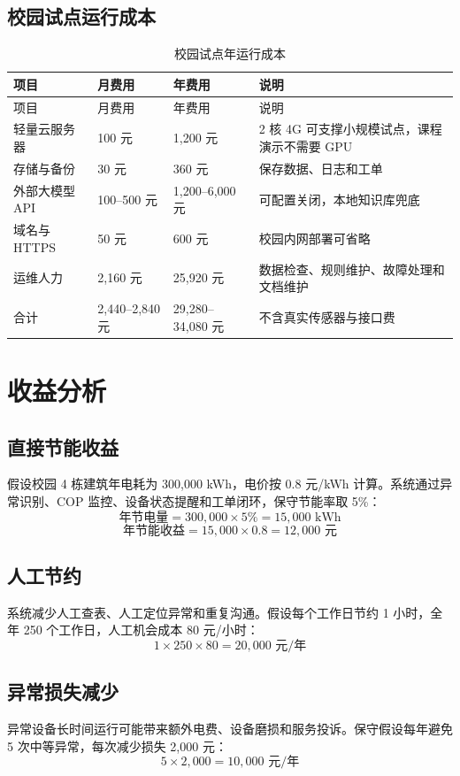 \documentclass[12pt,a4paper]{ctexart}
\begin{document}
\subsection{校园试点运行成本}
\begin{longtable}{p{4cm}p{2.8cm}p{2.8cm}p{4.4cm}}
\caption{校园试点年运行成本}\\
\toprule
项目 & 月费用 & 年费用 & 说明 \\
\midrule
\endfirsthead
\toprule
项目 & 月费用 & 年费用 & 说明 \\
\midrule
\endhead
轻量云服务器 & 100 元 & 1,200 元 & 2 核 4G 可支撑小规模试点，课程演示不需要 GPU \\
存储与备份 & 30 元 & 360 元 & 保存数据、日志和工单 \\
外部大模型 API & 100--500 元 & 1,200--6,000 元 & 可配置关闭，本地知识库兜底 \\
域名与 HTTPS & 50 元 & 600 元 & 校园内网部署可省略 \\
运维人力 & 2,160 元 & 25,920 元 & 数据检查、规则维护、故障处理和文档维护 \\
\midrule
合计 & 2,440--2,840 元 & 29,280--34,080 元 & 不含真实传感器与接口费 \\
\bottomrule
\end{longtable}

\section{收益分析}
\subsection{直接节能收益}
假设校园 4 栋建筑年电耗为 300,000 kWh，电价按 0.8 元/kWh 计算。系统通过异常识别、COP 监控、设备状态提醒和工单闭环，保守节能率取 5\%：
\[
\text{年节电量}=300,000 \times 5\% = 15,000 \text{ kWh}
\]
\[
\text{年节能收益}=15,000 \times 0.8 = 12,000 \text{ 元}
\]

\subsection{人工节约}
系统减少人工查表、人工定位异常和重复沟通。假设每个工作日节约 1 小时，全年 250 个工作日，人工机会成本 80 元/小时：
\[
1 \times 250 \times 80 = 20,000 \text{ 元/年}
\]

\subsection{异常损失减少}
异常设备长时间运行可能带来额外电费、设备磨损和服务投诉。保守假设每年避免 5 次中等异常，每次减少损失 2,000 元：
\[
5 \times 2,000 = 10,000 \text{ 元/年}
\]
\end{document}
